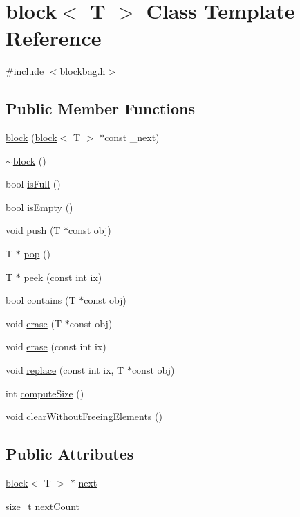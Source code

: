 \hypertarget{classblock}{}\section{block$<$ T $>$ Class Template Reference}
\label{classblock}


{\ttfamily \#include $<$blockbag.\+h$>$}

\subsection*{Public Member Functions}
\begin{DoxyCompactItemize}
\item 
\hyperlink{classblock_a5113ccde76ee845a786b0e1ad4b868c0}{block} (\hyperlink{classblock}{block}$<$ T $>$ $\ast$const \+\_\+next)
\item 
\hyperlink{classblock_a84efcb772c0aad6175b1dd456014c0b5}{$\sim$block} ()
\item 
bool \hyperlink{classblock_a87db81c761911a5915bb2bfd61480ff6}{is\+Full} ()
\item 
bool \hyperlink{classblock_a7785b6608b8d7f83b0d6c82a31d5ad6a}{is\+Empty} ()
\item 
void \hyperlink{classblock_ab91760496bae106253e3ddd42757287a}{push} (T $\ast$const obj)
\item 
T $\ast$ \hyperlink{classblock_aa247fbd643eede27ec2ca95882d72301}{pop} ()
\item 
T $\ast$ \hyperlink{classblock_a02fa9a5b650dba298ce58281394663fa}{peek} (const int ix)
\item 
bool \hyperlink{classblock_a5577a11404c029904366f2ca986af19d}{contains} (T $\ast$const obj)
\item 
void \hyperlink{classblock_aacb3664270c63f99c066035e7ca2fcc9}{erase} (T $\ast$const obj)
\item 
void \hyperlink{classblock_a797c59cf299d9d79333464b98290ba2b}{erase} (const int ix)
\item 
void \hyperlink{classblock_a2d3ae9852d97ae2debf1bf9b74a5f991}{replace} (const int ix, T $\ast$const obj)
\item 
int \hyperlink{classblock_ab15ffcbd3f70d06e95242afcfa801038}{compute\+Size} ()
\item 
void \hyperlink{classblock_ab986a1662a6962895ab967a62f741649}{clear\+Without\+Freeing\+Elements} ()
\end{DoxyCompactItemize}
\subsection*{Public Attributes}
\begin{DoxyCompactItemize}
\item 
\hyperlink{classblock}{block}$<$ T $>$ $\ast$ \hyperlink{classblock_a3c34670f424559a9404c00a0dafe48ce}{next}
\item 
size\+\_\+t \hyperlink{classblock_aa69ddeb6abdf14f17bb47598d10e6380}{next\+Count}
\end{DoxyCompactItemize}


